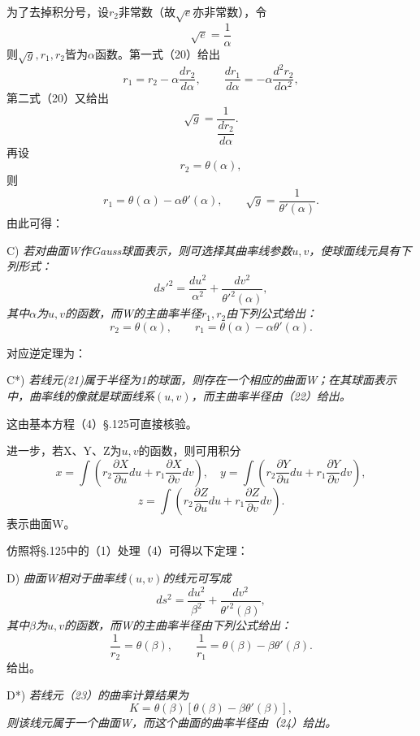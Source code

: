 为了去掉积分号，设\(r_2\)非常数（故\(\sqrt e\)亦非常数），令
\[
 \sqrt e=\frac1\alpha
\]
则\(\sqrt g, r_1, r_2\)皆为\(\alpha\)函数。第一式（20）给出
\[
 r_1=r_2-\alpha\frac{dr_2}{d\alpha},
 \qquad
 \frac{dr_1}{d\alpha}=-\alpha\frac{d^2r_2}{d\alpha^2},
\]
第二式（20）又给出
\[
 \sqrt g=\frac1{\dfrac{dr_2}{d\alpha}}.
\]
再设
\[
 r_2=\theta(\alpha),
\]
则
\[
 r_1=\theta(\alpha)-\alpha\theta'(\alpha),
 \qquad
 \sqrt g=\frac1{\theta'(\alpha)}.
\]
由此可得：

C) 
\emph{若对曲面W作Gauss球面表示，则可选择其曲率线参数\(u,v\)，使球面线元具有下列形式：}
\begin{equation}\tag{21}
 ds'^2=\frac{du^2}{\alpha^2}+\frac{dv^2}{\theta'^2(\alpha)},
\end{equation}
\emph{其中\(\alpha\)为\(u,v\)的函数，而W的主曲率半径\(r_1,r_2\)由下列公式给出：}
\begin{equation}\tag{22}
 r_2=\theta(\alpha),
 \qquad
 r_1=\theta(\alpha)-\alpha\theta'(\alpha).
\end{equation}

对应逆定理为：

C*) 
\emph{若线元(21)属于半径为1的球面，则存在一个相应的曲面W；在其球面表示中，曲率线的像就是球面线系\((u,v)\)，而主曲率半径由（22）给出。}

这由基本方程（4）\S.125可直接核验。

进一步，若X、Y、Z为\(u,v\)的函数，则可用积分
\[
 x=\int\left(r_2\frac{\partial X}{\partial u}du+r_1\frac{\partial X}{\partial v}dv\right),
 \quad
 y=\int\left(r_2\frac{\partial Y}{\partial u}du+r_1\frac{\partial Y}{\partial v}dv\right),
\]
\[
 z=\int\left(r_2\frac{\partial Z}{\partial u}du+r_1\frac{\partial Z}{\partial v}dv\right).
\]
表示曲面W。

仿照将\S.125中的（1）处理（4）可得以下定理：

D) 
\emph{曲面W相对于曲率线\((u,v)\)的线元可写成}
\begin{equation}\tag{23}
 ds^2=\frac{du^2}{\beta^2}+\frac{dv^2}{\theta'^2(\beta)},
\end{equation}
\emph{其中\(\beta\)为\(u,v\)的函数，而W的主曲率半径由下列公式给出：}
\begin{equation}\tag{24}
 \frac1{r_2}=\theta(\beta),
 \qquad
 \frac1{r_1}=\theta(\beta)-\beta\theta'(\beta).
\end{equation}
给出。

D*) 
\emph{若线元（23）的曲率计算结果为}
\[
 K=\theta(\beta)\left[\theta(\beta)-\beta\theta'(\beta)\right],
\]
\emph{则该线元属于一个曲面W，而这个曲面的曲率半径由（24）给出。}

